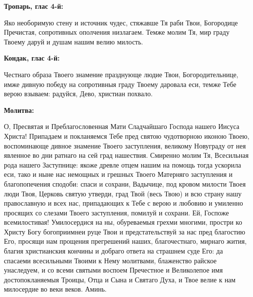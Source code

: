  


\bfseries Тропарь, глас 4-й\normalfont{}:


Яко необоримую стену и источник чудес, стяжавше Тя раби Твои, Богородице Пречистая, сопротивных ополчения низлагаем. Темже молим Тя, мир граду Твоему даруй и душам нашим велию милость.


\medskip


\bfseries Кондак, глас 4-й\normalfont{}:


Честнаго образа Твоего знамение празднующе людие Твои, Богородительнице, имже дивную победу на сопротивныя граду Твоему даровала еси, темже Тебе верою взываем: радуйся, Дево, христиан похвало.


\medskip


\bfseries Молитва\normalfont{}:


О, Пресвятая и Преблагословенная Мати Сладчайшаго Господа нашего Иисуса Христа! Припадаем и покланяемся Тебе пред святою чудотворною иконою Твоею, воспоминающе дивное знамение Твоего заступления, великому Новуграду от нея явленное во дни ратнаго на сей град нашествия. Смиренно молим Тя, Всесильная рода нашего Заступнице: якоже древле отцем нашим на помощь тогда ускорила еси, тако и ныне нас немощных и грешных Твоего Матерняго заступления и благопопечения сподоби: спаси и сохрани, Вадычице, под кровом милости Твоея люди Твоя, Церковь святую утверди, град Твой (весь Твою) и всю страну нашу православную и всех нас, припадающих к Тебе с верою и любовию и умиленно просящих со слезами Твоего заступления, помилуй и сохрани. Ей, Госпоже всемилостивая! Умилосердися на ны, обуреваемыя грехми многими, простри ко Христу Богу богоприимнеи руце Твои и предстательствуй за нас пред благостию Его, просящи нам прощения прегрешений наших, благочестнаго, мирнаго жития, благия христианския кончины и добраго ответа на страшнем суде Его: да спасаеми всесильными Твоими к Нему молитвами, блаженство райское унаследуем, и со всеми святыми воспоем Пречестное и Великолепое имя достопокланяемыя Троицы, Отца и Сына и Святаго Духа, и Твое велие к нам милосердие во веки веков. Аминь.


\bigskip\bigskip\mychapterending
